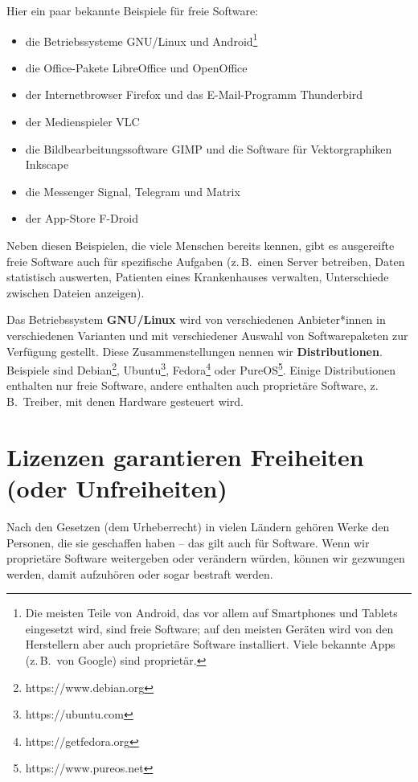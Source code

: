\documentclass[a5paper,12pt]{scrartcl}
\begin{document}
Hier ein paar bekannte Beispiele für freie Software:
\begin{itemize}
\item die Betriebssysteme GNU/Linux und Android\footnote{Die meisten
    Teile von Android, das vor allem auf Smartphones und Tablets
    eingesetzt wird, sind freie Software; auf den meisten Geräten wird
    von den Herstellern aber auch proprietäre Software
    installiert. Viele bekannte Apps (z.\,B.\ von Google) sind
    proprietär.}
\item die Office-Pakete LibreOffice und OpenOffice
\item der Internetbrowser Firefox und das E-Mail-Programm Thunderbird
\item der Medienspieler VLC
\item die Bildbearbeitungssoftware GIMP und die Software für
  Vektorgraphiken Inkscape
\item die Messenger Signal, Telegram und Matrix
\item der App-Store F-Droid
\end{itemize}

Neben diesen Beispielen, die viele Menschen bereits kennen, gibt es
ausgereifte freie Software auch für spezifische Aufgaben (z.\,B.\
einen Server betreiben, Daten statistisch auswerten, Patienten eines
Krankenhauses verwalten, Unterschiede zwischen Dateien anzeigen).

Das Betriebssystem \textbf{GNU/Linux} wird von verschiedenen
Anbieter*innen in verschiedenen Varianten und mit verschiedener
Auswahl von Softwarepaketen zur Verfügung gestellt. Diese
Zusammenstellungen nennen wir \textbf{Distributionen}. Beispiele sind
Debian\footnote{https://www.debian.org},
Ubuntu\footnote{https://ubuntu.com},
Fedora\footnote{https://getfedora.org} oder
PureOS\footnote{https://www.pureos.net}. Einige Distributionen
enthalten nur freie Software, andere enthalten auch proprietäre
Software, z.\,B.\ Treiber, mit denen Hardware gesteuert wird.


\section{Lizenzen garantieren Freiheiten (oder Unfreiheiten)}

Nach den Gesetzen (dem Urheberrecht) in vielen Ländern gehören Werke
den Personen, die sie geschaffen haben -- das gilt auch für
Software. Wenn wir proprietäre Software weitergeben oder verändern
würden, können wir gezwungen werden, damit aufzuhören oder sogar
bestraft werden.
\end{document}
